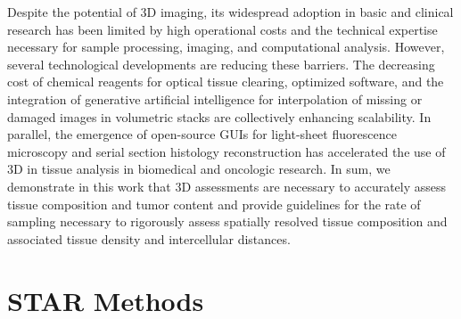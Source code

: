 \begin{refsection}
    Despite the potential of 3D imaging, its widespread adoption in basic and clinical research has been limited by high operational costs and the technical expertise necessary for sample processing, imaging, and computational analysis. However, several technological developments are reducing these barriers. The decreasing cost of chemical reagents for optical tissue clearing\cite{Lee2022MAX,Kim2022Optimized,Tomer2014Advanced,Glaser2019Multi,Ku2020Elasticizing}, optimized software\cite{Vladimirov2024Benchtop,Otomo2024descSPIM}, and the integration of generative artificial intelligence for interpolation of missing or damaged images in volumetric stacks are collectively enhancing scalability\cite{SaurabhInterpolAI}. In parallel, the emergence of open-source GUIs for light-sheet fluorescence microscopy and serial section histology reconstruction has accelerated the use of 3D in tissue analysis in biomedical and oncologic research\cite{Matos2025CODAvision,Marin2024navigate}.
    In sum, we demonstrate in this work that 3D assessments are necessary to accurately assess tissue composition and tumor content and provide guidelines for the rate of sampling necessary to rigorously assess spatially resolved tissue composition and associated tissue density and intercellular distances.
    
    \section{STAR Methods}


\end{refsection}
